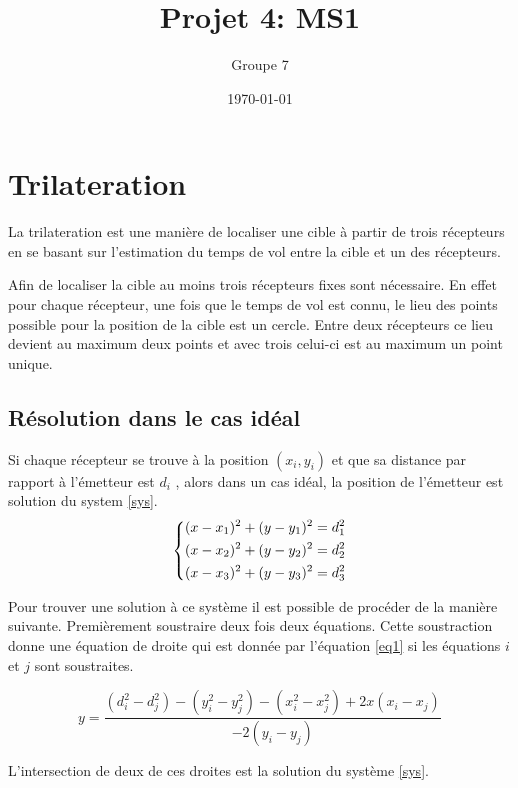 \documentclass[10pt,a4paper]{article}
\begin{document}
\title{Projet 4: MS1}
\date\today
\author{Groupe 7}
\maketitle

\section{Trilateration}
	La trilateration est une manière de localiser une cible à partir de trois récepteurs en se basant sur l'estimation du temps de vol entre la cible et un des récepteurs. 
		
		
	Afin de localiser la cible au moins trois récepteurs fixes sont nécessaire. En effet pour chaque récepteur, une fois que le temps de vol est connu, le lieu des points possible pour la position de la cible est un cercle. Entre deux récepteurs ce lieu devient au maximum deux points et avec trois celui-ci est au maximum un point unique. 
		\subsection{Résolution dans le cas idéal}
		Si chaque récepteur se trouve à la position $(x_i , y_i)$ et que sa distance par rapport à l'émetteur est $d_i$ , alors dans un cas idéal, la position de l'émetteur est solution du system \ref{sys}.  
		\begin{equation}
		\begin{dcases}
			(x - x_1)^2 + (y-y_1)^2 = d_1^2 \\
			(x - x_2)^2 + (y-y_2)^2 = d_2^2 \\
			(x - x_3)^2 + (y-y_3)^2 = d_3^2 
		\end{dcases}
		\label{sys}
		\end{equation}
		
		Pour trouver une solution à ce système il est possible de procéder de la manière suivante. Premièrement soustraire deux fois deux équations. Cette soustraction donne une équation de droite qui est donnée par l'équation \ref{eq1} si les équations $i$ et $j$ sont soustraites.
		
		\begin{equation}
			\label{eq1}
			y = \frac{(d_i^2 - d_j^2) - (y_i^2 -y_j^2)-(x_i^2 - x_j^2) + 2x(x_i-x_j)}{-2(y_i-y_j)}
		\end{equation}
		
		L'intersection de deux de ces droites est la solution du système \ref{sys}. 
		
\end{document}
